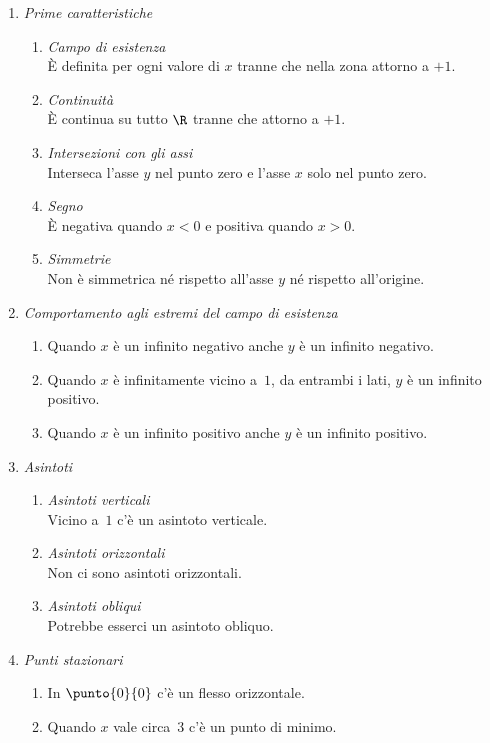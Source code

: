  \begin{enumerate} [nosep]
  \item \emph{Prime caratteristiche}
  \begin{enumerate} [nosep]
  \item \emph{Campo di esistenza}\\
  È definita per ogni valore di \(x\) tranne che nella zona attorno a \(+1\).
  \item \emph{Continuità}\\
  È continua su tutto \(\R\) tranne che attorno a \(+1\).
  \item \emph{Intersezioni con gli assi}\\
  Interseca l'asse \(y\) nel punto zero e l'asse \(x\) solo nel punto zero.
  \item \emph{Segno}\\
  È negativa quando \(x<0\) e positiva quando \(x>0\).
  \item \emph{Simmetrie}\\
  Non è simmetrica né rispetto all'asse \(y\) né rispetto all'origine.
  \end{enumerate}
  
  \item \emph{Comportamento agli estremi del campo di esistenza}
  \begin{enumerate} [nosep]
   \item Quando \(x\) è un infinito negativo anche \(y\) è un infinito 
negativo.
   \item Quando \(x\) è infinitamente vicino a~\(1\), da entrambi i lati, 
\(y\) è un infinito positivo.
   \item Quando \(x\) è un infinito positivo anche \(y\) è un infinito 
positivo.
  \end{enumerate}
  
  \item \emph{Asintoti}
  \begin{enumerate} [nosep]
  \item \emph{Asintoti verticali}\\
  Vicino a~\(1\) c'è un asintoto verticale.
  \item \emph{Asintoti orizzontali}\\
  Non ci sono asintoti orizzontali.
  \item \emph{Asintoti obliqui}\\
  Potrebbe esserci un asintoto obliquo.
  \end{enumerate}
  
  \item \emph{Punti stazionari}
  \begin{enumerate} [nosep]
  \item In \(\punto{0}{0}\) c'è un flesso orizzontale.
  \item Quando \(x\) vale circa~3 c'è un punto di minimo.
  \end{enumerate}
 

\end{enumerate}

